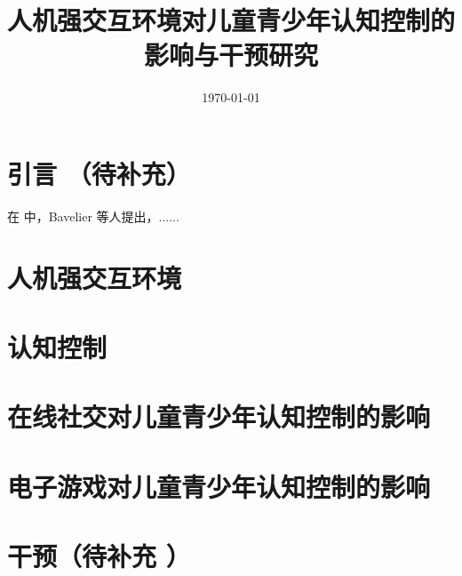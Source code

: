 \documentclass[12pt]{book}
\title{人机强交互环境对儿童青少年认知控制的影响与干预研究}
\date{\today}
\begin{document}
 
\maketitle

\tableofcontents


\chapter{引言 （待补充）}


在\cite{bavelieretal2011} 中，Bavelier 等人提出，......

\chapter{人机强交互环境 }


\chapter{认知控制  }


\chapter{在线社交对儿童青少年认知控制的影响}


\chapter{电子游戏对儿童青少年认知控制的影响}


\chapter{干预（待补充 ）}








\end{document}
